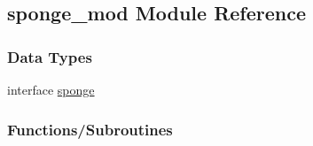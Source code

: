 \hypertarget{namespacesponge__mod}{}\subsection{sponge\+\_\+mod Module Reference}
\label{namespacesponge__mod}
\subsubsection*{Data Types}
\begin{DoxyCompactItemize}
\item 
interface \mbox{\hyperlink{structsponge__mod_1_1sponge}{sponge}}
\end{DoxyCompactItemize}
\subsubsection*{Functions/\+Subroutines}
